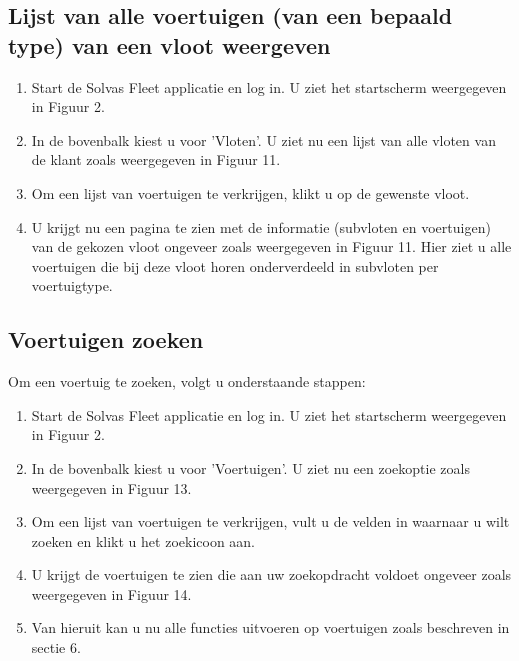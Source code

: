 \documentclass[11pt,openany]{article}
\begin{document}
\subsection{Lijst van alle voertuigen (van een bepaald type) van een vloot weergeven}
\begin{enumerate}
	\item Start de Solvas Fleet applicatie en log in. U ziet het startscherm weergegeven in Figuur 2.
	\item In de bovenbalk kiest u voor 'Vloten'. U ziet nu een lijst van alle vloten van de klant zoals weergegeven in Figuur 11.
	\item Om een lijst van voertuigen te verkrijgen, klikt u op de gewenste vloot.
	\item U krijgt nu een pagina te zien met de informatie (subvloten en voertuigen) van de gekozen vloot
	ongeveer zoals weergegeven in Figuur 11. Hier ziet u alle voertuigen die bij deze vloot horen onderverdeeld in subvloten per voertuigtype.
\end{enumerate}

\subsection{Voertuigen zoeken}
Om een voertuig te zoeken, volgt u onderstaande stappen:
\begin{enumerate}
	\item Start de Solvas Fleet applicatie en log in. U ziet het startscherm weergegeven in Figuur 2.
	\item In de bovenbalk kiest u voor 'Voertuigen'. U ziet nu een zoekoptie zoals weergegeven in Figuur 13.
	\item Om een lijst van voertuigen te verkrijgen, vult u de velden in waarnaar u wilt zoeken en klikt u het zoekicoon aan.
	\item U krijgt de voertuigen te zien die aan uw zoekopdracht voldoet ongeveer zoals weergegeven in Figuur 14.
	\item Van hieruit kan u nu alle functies uitvoeren op voertuigen zoals beschreven in sectie 6.
\end{enumerate}
\end{document}
